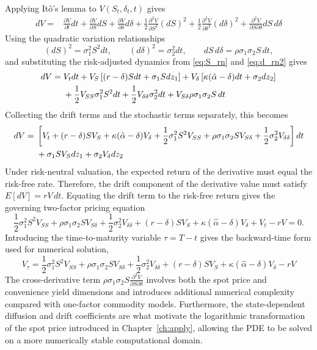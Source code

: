 \documentclass[12pt,a4paper]{article}
\begin{document}
Applying It\^o's lemma to $V(S_t,\delta_t,t)$ gives
\begin{align}
dV ={}& 
\frac{\partial V}{\partial t}dt
+\frac{\partial V}{\partial S}dS
+\frac{\partial V}{\partial \delta}d\delta
+\frac{1}{2}\frac{\partial^2 V}{\partial S^2}(dS)^2 +\frac{1}{2}\frac{\partial^2 V}{\partial \delta^2}(d\delta)^2
+\frac{\partial^2 V}{\partial S\partial\delta}dS\,d\delta
\end{align}
Using the quadratic variation relationships
\begin{equation}
    (dS)^2=\sigma_1^2S^2dt,
    \qquad
    (d\delta)^2=\sigma_2^2dt,
    \qquad
    dS\,d\delta=\rho\sigma_1\sigma_2S\,dt,
\end{equation}
and substituting the risk-adjusted dynamics from \eqref{eq:S_rn} and \eqref{eq:d_rn2} gives
\begin{align}
dV ={}&
V_tdt
+V_S\left[(r-\delta)Sdt+\sigma_1Sdz_1\right] + V_\delta\left[\kappa(\hat{\alpha}-\delta)dt+\sigma_2dz_2\right] \notag\\
&+\frac{1}{2}V_{SS}\sigma_1^2S^2dt
+\frac{1}{2}V_{\delta\delta}\sigma_2^2dt
+V_{S\delta}\rho\sigma_1\sigma_2S\,dt
\end{align}
Collecting the drift terms and the stochastic terms separately, this becomes
\begin{align}
dV ={}&
\left[
V_t
+(r-\delta)SV_S
+\kappa(\hat{\alpha}-\delta)V_\delta
+\frac{1}{2}\sigma_1^2S^2V_{SS}
+\rho\sigma_1\sigma_2SV_{S\delta}
+\frac{1}{2}\sigma_2^2V_{\delta\delta}
\right]dt\notag\\
&+\sigma_1SV_Sdz_1+\sigma_2V_\delta dz_2
\end{align}
Under risk-neutral valuation, the expected return of the derivative must equal the risk-free rate. Therefore, the drift component of the derivative value must satisfy ${E}[dV]=rV\,dt$. Equating the drift term to the risk-free return gives the governing two-factor pricing equation
\begin{equation}
\frac{1}{2}\sigma_1^2S^2V_{SS}
+
\rho\sigma_1\sigma_2SV_{S\delta}
+
\frac{1}{2}\sigma_2^2V_{\delta\delta}
+
(r-\delta)SV_S
+
\kappa(\hat{\alpha}-\delta)V_\delta
+
V_t
-rV=0.
\end{equation}
Introducing the time-to-maturity variable $\tau=T-t$ gives the backward-time form used for numerical solution,
\begin{equation}\label{eq:pde_tau}
V_\tau=\frac{1}{2}\sigma_1^2S^2V_{SS}
+
\rho\sigma_1\sigma_2SV_{S\delta}
+
\frac{1}{2}\sigma_2^2V_{\delta\delta}
+
(r-\delta)SV_S
+
\kappa(\hat{\alpha}-\delta)V_\delta
-rV
\end{equation}
The cross-derivative term $\rho\sigma_1\sigma_2S\frac{\partial^2V}{\partial S\partial\delta}$ involves both the spot price and convenience yield dimensions and introduces additional numerical complexity compared with one-factor commodity models. Furthermore, the state-dependent diffusion and drift coefficients are what motivate the logarithmic transformation of the spot price introduced in Chapter~\ref{ch:apply}, allowing the PDE to be solved on a more numerically stable computational domain.
\end{document}
